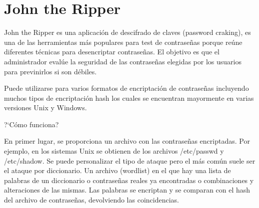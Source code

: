 \documentclass[a4paper, 11pt]{article}
\theoremstyle{plain}
\begin{document}





\section{John the Ripper}

John the Ripper es una aplicación de descifrado de claves (password craking), es una de las herramientas más populares para test de contraseñas porque reúne diferentes técnicas para desencriptar contraseñas. El objetivo es que el administrador evalúe la seguridad de las contraseñas elegidas por los usuarios para previnirlos si son débiles.

Puede utilizarse para varios formatos de encriptación de contraseñas incluyendo muchos tipos de encriptación hash los cuales se encuentran mayormente en varias versiones Unix y Windows.

?`Cómo funciona?

En primer lugar, se proporciona un archivo con las contraseñas encriptadas. Por ejemplo, en los sistemas Unix se obtienen de los archivos /etc/passwd y /etc/shadow. Se puede personalizar el tipo de ataque pero el más común suele ser el ataque por diccionario. Un archivo (wordlist) en el que hay una lista de palabras de un diccionario o contraseñas reales ya encontradas o combinaciones y alteraciones de las mismas. Las palabras se encriptan y se comparan con el hash del archivo de contraseñas, devolviendo las coincidencias.  
\end{document}
